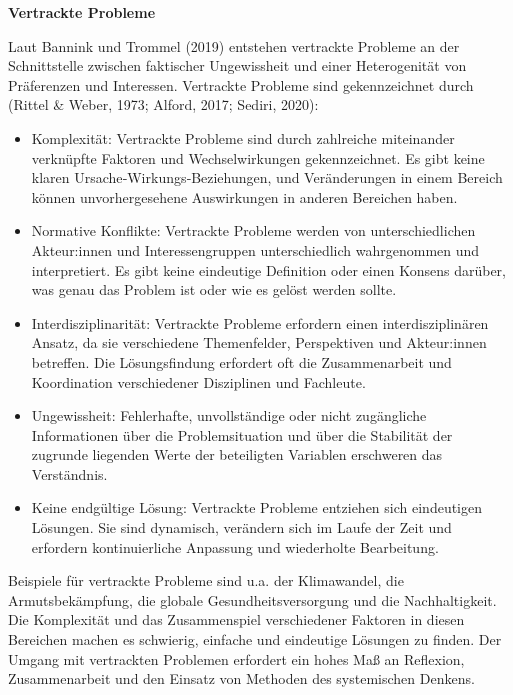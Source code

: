 \documentclass[
  letterpaper,
  DIV=11,
  numbers=noendperiod]{scrartcl}
\begin{document}
\begin{tcolorbox}[enhanced jigsaw, breakable, left=2mm, colback=white, leftrule=.75mm, opacityback=0, bottomrule=.15mm, toprule=.15mm, arc=.35mm, rightrule=.15mm, colframe=quarto-callout-note-color-frame]

\vspace{-3mm}\textbf{Vertrackte Probleme}\vspace{3mm}

Laut Bannink und Trommel (2019) entstehen vertrackte Probleme an der
Schnittstelle zwischen faktischer Ungewissheit und einer Heterogenität
von Präferenzen und Interessen. Vertrackte Probleme sind gekennzeichnet
durch (Rittel \& Weber, 1973; Alford, 2017; Sediri, 2020):

\begin{itemize}
\item
  Komplexität: Vertrackte Probleme sind durch zahlreiche miteinander
  verknüpfte Faktoren und Wechselwirkungen gekennzeichnet. Es gibt keine
  klaren Ursache‑Wirkungs‑Beziehungen, und Veränderungen in einem
  Bereich können unvorhergesehene Auswirkungen in anderen Bereichen
  haben.
\item
  Normative Konflikte: Vertrackte Probleme werden von unterschiedlichen
  Akteur:innen und Interessengruppen unterschiedlich wahrgenommen und
  interpretiert. Es gibt keine eindeutige Definition oder einen Konsens
  darüber, was genau das Problem ist oder wie es gelöst werden sollte.
\item
  Interdisziplinarität: Vertrackte Probleme erfordern einen
  interdisziplinären Ansatz, da sie verschiedene Themenfelder,
  Perspektiven und Akteur:innen betreffen. Die Lösungsfindung erfordert
  oft die Zusammenarbeit und Koordination verschiedener Disziplinen und
  Fachleute.
\item
  Ungewissheit: Fehlerhafte, unvollständige oder nicht zugängliche
  Informationen über die Problemsituation und über die Stabilität der
  zugrunde liegenden Werte der beteiligten Variablen erschweren das
  Verständnis.
\item
  Keine endgültige Lösung: Vertrackte Probleme entziehen sich
  eindeutigen Lösungen. Sie sind dynamisch, verändern sich im Laufe der
  Zeit und erfordern kontinuierliche Anpassung und wiederholte
  Bearbeitung.
\end{itemize}

Beispiele für vertrackte Probleme sind u.a. der Klimawandel, die
Armutsbekämpfung, die globale Gesundheitsversorgung und die
Nachhaltigkeit. Die Komplexität und das Zusammenspiel verschiedener
Faktoren in diesen Bereichen machen es schwierig, einfache und
eindeutige Lösungen zu finden. Der Umgang mit vertrackten Problemen
erfordert ein hohes Maß an Reflexion, Zusammenarbeit und den Einsatz von
Methoden des systemischen Denkens.

\end{tcolorbox}
\end{document}
